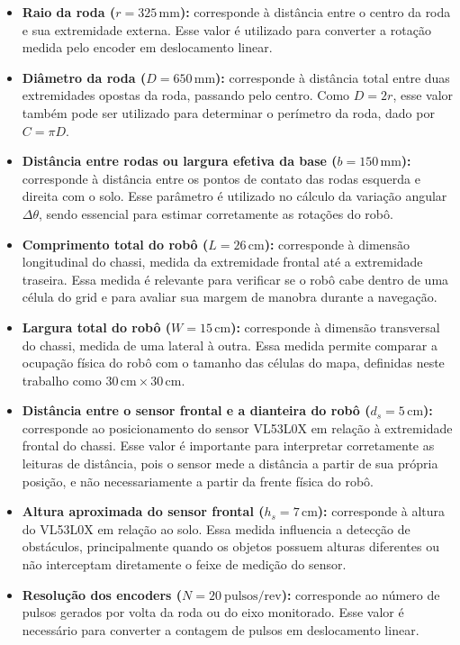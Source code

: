 \documentclass[	12pt, Times, openright, twoside, a4paper, english, brazil]{abntex2}
\begin{document}
\begin{itemize}
	\item \textbf{Raio da roda ($r = 325\,\text{mm}$):} corresponde à distância entre o centro da roda e sua extremidade externa. Esse valor é utilizado para converter a rotação medida pelo encoder em deslocamento linear.

	\item \textbf{Diâmetro da roda ($D = 650\,\text{mm}$):} corresponde à distância total entre duas extremidades opostas da roda, passando pelo centro. Como $D = 2r$, esse valor também pode ser utilizado para determinar o perímetro da roda, dado por $C = \pi D$.

	\item \textbf{Distância entre rodas ou largura efetiva da base ($b = 150\,\text{mm}$):} corresponde à distância entre os pontos de contato das rodas esquerda e direita com o solo. Esse parâmetro é utilizado no cálculo da variação angular $\Delta \theta$, sendo essencial para estimar corretamente as rotações do robô.

	\item \textbf{Comprimento total do robô ($L = 26\,\text{cm}$):} corresponde à dimensão longitudinal do chassi, medida da extremidade frontal até a extremidade traseira. Essa medida é relevante para verificar se o robô cabe dentro de uma célula do grid e para avaliar sua margem de manobra durante a navegação.

	\item \textbf{Largura total do robô ($W = 15\,\text{cm}$):} corresponde à dimensão transversal do chassi, medida de uma lateral à outra. Essa medida permite comparar a ocupação física do robô com o tamanho das células do mapa, definidas neste trabalho como $30\,\text{cm} \times 30\,\text{cm}$.

	\item \textbf{Distância entre o sensor frontal e a dianteira do robô ($d_s = 5\,\text{cm}$):} corresponde ao posicionamento do sensor VL53L0X em relação à extremidade frontal do chassi. Esse valor é importante para interpretar corretamente as leituras de distância, pois o sensor mede a distância a partir de sua própria posição, e não necessariamente a partir da frente física do robô.

	\item \textbf{Altura aproximada do sensor frontal ($h_s = 7\,\text{cm}$):} corresponde à altura do VL53L0X em relação ao solo. Essa medida influencia a detecção de obstáculos, principalmente quando os objetos possuem alturas diferentes ou não interceptam diretamente o feixe de medição do sensor.

	\item \textbf{Resolução dos encoders ($N = 20\ \text{pulsos/rev}$):} corresponde ao número de pulsos gerados por volta da roda ou do eixo monitorado. Esse valor é necessário para converter a contagem de pulsos em deslocamento linear.
\end{itemize}
\end{document}
